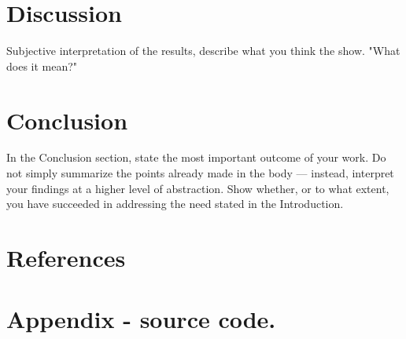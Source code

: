 \documentclass[a4paper,11pt,notitlepage,twocolumn]{article}
\begin{document}
  \section{Discussion}
    Subjective interpretation of the results, describe what you think the show.
    "What does it mean?"
    
  \section{Conclusion}
    In the Conclusion section, state the most important outcome of your work. Do not simply
    summarize the points already made in the body — instead, interpret your findings at a
    higher level of abstraction. Show whether, or to what extent, you have succeeded in
    addressing the need stated in the Introduction.
    
  \section{References}
    

  \onecolumn
  \section{Appendix - source code.}
\end{document}

